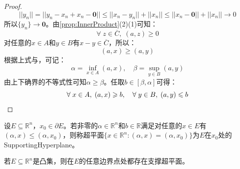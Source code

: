 \begin{proof}
	\begin{equation*}
		||y_n||=||y_n-x_n+x_n-\mathbf{0}||\leqslant||x_n-y_n||+||x_n||\leqslant||x_n-\mathbf{0}||+||x_n||\to0
	\end{equation*}
	所以$\{y_n\}\to\mathbf{0}$。由\cref{prop:InnerProduct}(2)(1)可知：
	\begin{equation*}
		\forall\;z\in\overline{C},\;(a,z)\geqslant0
	\end{equation*}
	对任意的$x\in A$和$y\in B$有$x-y\in\overline{C}$，所以：
	\begin{equation*}
		(a,x)\geqslant(a,y)
	\end{equation*}
	根据上式与，可记：
	\begin{equation*}
		\alpha=\inf_{x\in A}(a,x),\quad\beta=\sup_{y\in B}(a,y)
	\end{equation*}
	由上下确界的不等式性可知$\alpha\geqslant\beta$。任取$b\in[\beta,\alpha]$可得：
	\begin{equation*}
		\forall\;x\in A,\;(a,x)\geqslant b,\quad\forall\;y\in B,\;(a,y)\leqslant b\qedhere
	\end{equation*}
\end{proof}
\begin{definition}
	设$E\subseteq\mathbb{R}^{n}$，$x_0\in\partial E$。若非零的$\alpha\in\mathbb{R}^{n}$和$b\in\mathbb{R}$满足对任意的$x\in E$有$(\alpha,x)\leqslant(\alpha,x_0)$，则称超平面$\{x\in\mathbb{R}^{n}:(\alpha,x)=(\alpha,x_0)\}$为$E$在$x_0$处的\gls{SupportingHyperplane}。
\end{definition}
\begin{theorem}\label{theo:SupportingHyperplaneTheorem}
	若$E\subseteq\mathbb{R}^{n}$是凸集，则在$E$的任意边界点处都存在支撑超平面。
\end{theorem}
